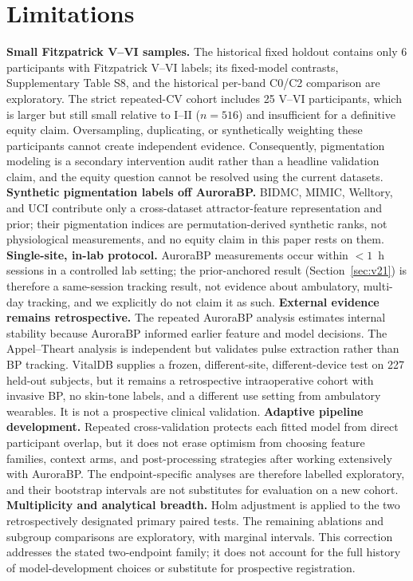 \documentclass[journal]{IEEEtran}
\begin{document}
\section{Limitations}
\label{sec:limitations}
\textbf{Small Fitzpatrick V--VI samples.} The historical fixed holdout contains only 6 participants with Fitzpatrick V--VI labels; its fixed-model contrasts, Supplementary Table S8, and the historical per-band C0/C2 comparison are exploratory. The strict repeated-CV cohort includes 25 V--VI participants, which is larger but still small relative to I--II ($n=516$) and insufficient for a definitive equity claim. Oversampling, duplicating, or synthetically weighting these participants cannot create independent evidence. Consequently, pigmentation modeling is a secondary intervention audit rather than a headline validation claim, and the equity question cannot be resolved using the current datasets.
\textbf{Synthetic pigmentation labels off AuroraBP.} BIDMC, MIMIC, Welltory, and UCI contribute only a cross-dataset attractor-feature representation and prior; their pigmentation indices are permutation-derived synthetic ranks, not physiological measurements, and no equity claim in this paper rests on them.
\textbf{Single-site, in-lab protocol.} AuroraBP measurements occur within $<1$~h sessions in a controlled lab setting; the prior-anchored result (Section~\ref{sec:v21}) is therefore a same-session tracking result, not evidence about ambulatory, multi-day tracking, and we explicitly do not claim it as such.
\textbf{External evidence remains retrospective.} The repeated AuroraBP analysis estimates internal stability because AuroraBP informed earlier feature and model decisions. The Appel--Theart analysis is independent but validates pulse extraction rather than BP tracking. VitalDB supplies a frozen, different-site, different-device test on 227 held-out subjects, but it remains a retrospective intraoperative cohort with invasive BP, no skin-tone labels, and a different use setting from ambulatory wearables. It is not a prospective clinical validation.
\textbf{Adaptive pipeline development.} Repeated cross-validation protects each fitted model from direct participant overlap, but it does not erase optimism from choosing feature families, context arms, and post-processing strategies after working extensively with AuroraBP. The endpoint-specific analyses are therefore labelled exploratory, and their bootstrap intervals are not substitutes for evaluation on a new cohort.
\textbf{Multiplicity and analytical breadth.} Holm adjustment is applied to the two retrospectively designated primary paired tests. The remaining ablations and subgroup comparisons are exploratory, with marginal intervals. This correction addresses the stated two-endpoint family; it does not account for the full history of model-development choices or substitute for prospective registration.
\end{document}
